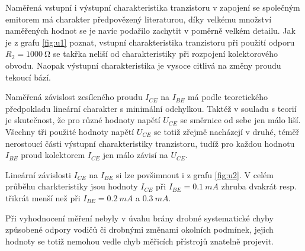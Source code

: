 \documentclass[0-protokol.tex]{subfiles}
\begin{document}
Naměřená vstupní i výstupní charakteristika tranzistoru v zapojení se společným emitorem má charakter předpovězený literaturou, díky velkému množství naměřených hodnot se je navíc podařilo zachytit v poměrně velkém detailu. Jak je z grafu \ref{fig:u1} poznat, vstupní charakteristika tranzistoru při použití odporu $R_2 = \SI{1000}{\ohm}$ se takřka neliší od charakteristiky při rozpojení kolektorového obvodu. Naopak výstupní charakteristika je vysoce citlivá na změny proudu tekoucí bází.

Naměřená závislost zesíleného proudu $I_{CE}$ na $I_{BE}$ má podle teoretického předpokladu lineární charakter s minimální odchylkou. Taktéž v souladu s teorií je skutečnost, že pro různé hodnoty napětí $U_{CE}$ se směrnice od sebe jen málo liší. Všechny tři použité hodnoty napětí $U_{CE}$ se totiž zřejmě nacházejí v druhé, téměř nerostoucí části výstupní charakteristiky tranzistoru, tudíž pro každou hodnotu $I_{BE}$ proud kolektorem $I_{CE}$ jen málo závisí na $U_{CE}$.

Lineární závislosti $I_{CE}$ na $I_{BE}$ si lze povšimnout i z grafu \ref{fig:u2}. V celém průběhu charkteristiky jsou hodnoty $I_{CE}$ při $I_{BE} = \SI{0.1}{mA}$ zhruba dvakrát resp. třikrát menší než při $I_{BE} = \SI{0.2}{mA}$ a $\SI{0.3}{mA}$. 

Při vyhodnocení měření nebyly v úvahu brány drobné systematické chyby způsobené odpory vodičů či drobnými změnami okolních podmínek, jejich hodnoty se totiž nemohou vedle chyb měřicích přístrojů znatelně projevit.
\end{document}

